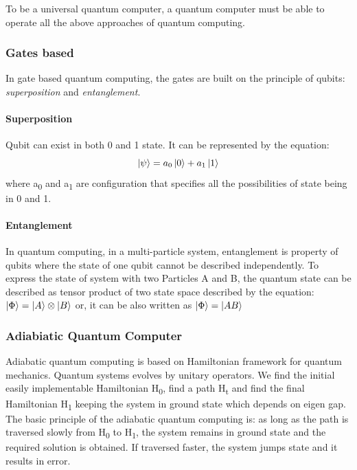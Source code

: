 \documentclass[12pt,conference]{IEEEtran}
\begin{document}
To be a universal quantum computer, a quantum computer must be able to operate all the above approaches of quantum computing.







\subsubsection{Gates based}
In gate based quantum computing, the gates are built on the principle of qubits: \emph{superposition} and \emph{entanglement}.

\paragraph{Superposition}
Qubit can exist in both 0 and 1 state. It can be represented by the equation:
\begin{equation*}
  \ket {\psi} = a_0 \ket{0} + a_1 \ket{1}
\end{equation*} 
where a\textsubscript{0} and a\textsubscript{1} are configuration that specifies all the possibilities of state being in 0 and 1.

\paragraph{Entanglement}
In quantum computing, in a multi-particle system, entanglement is property of qubits where the state of one qubit cannot be described independently. To express the state of system with two Particles A and B, the quantum state can be described as tensor product of two state space described by the equation:
$\ket {\Phi} = \ket{A} \otimes \ket{B}$
or, it can be also written as
$\ket {\Phi} = \ket{AB}$


\subsubsection{Adiabiatic Quantum Computer}
Adiabatic quantum computing is based on Hamiltonian framework for quantum mechanics. Quantum systems evolves by unitary operators. We find the initial easily implementable Hamiltonian H\textsubscript{0}, find a path H\textsubscript{t} and find the final Hamiltonian H\textsubscript{1} keeping the system in ground state which depends on eigen gap. The basic principle of the adiabatic quantum computing is: as long as the path is traversed slowly from H\textsubscript{0} to H\textsubscript{1}, the system remains in ground state and the required solution is obtained. If traversed faster, the system jumps state and it results in error. 
\end{document}
